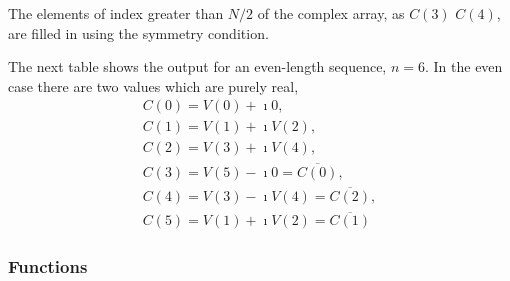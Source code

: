 The elements of index greater than $N/2$ of the complex array, as $C(3)$
$C(4)$, are filled in using the symmetry condition.

The next table shows the output for an even-length sequence, $n=6$.
In the even case there are two values which are purely real, 
\begin{equation}
  \begin{array}{l}
         C(0) =  V(0) + \imath 0, \\ 
         C(1) =  V(1) + \imath V(2), \\
         C(2) =  V(3) + \imath V(4), \\
         C(3) = V(5) - \imath 0    =  \overline{C(0)} , \\
         C(4) = V(3) - \imath V(4) =  \overline{C(2)} , \\
         C(5) = V(1) + \imath V(2) =  \overline{C(1)} 
  \end{array}   
 \end{equation}


\subsubsection{Functions}


